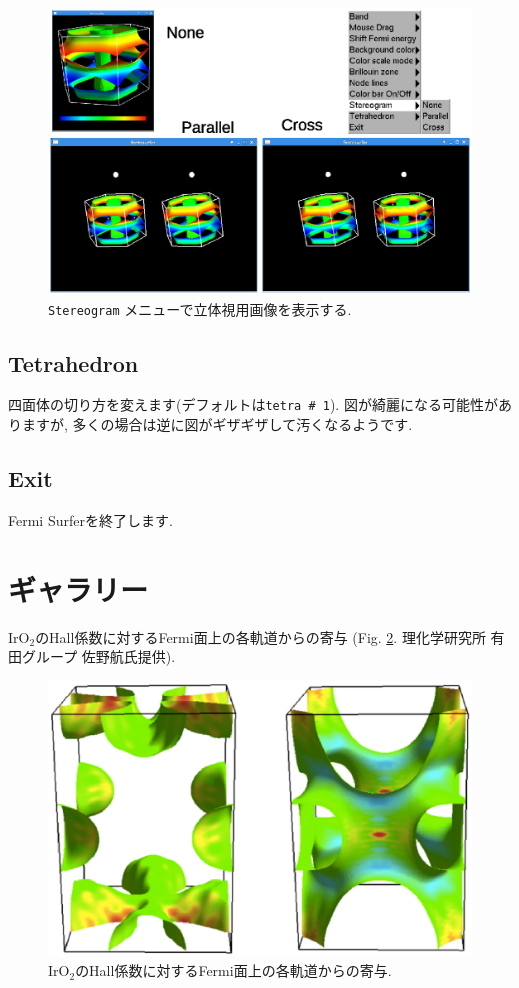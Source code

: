 \documentclass[12pt]{jarticle}
\begin{document}
\begin{figure}[!ht]
  \includegraphics[width=17cm]{figs/stereogram.eps}
  \caption{\texttt{Stereogram} メニューで立体視用画像を表示する.}
  \label{fig_stereogram}
\end{figure}

\subsection{Tetrahedron}

四面体の切り方を変えます(デフォルトは\texttt{tetra \# 1}).
図が綺麗になる可能性がありますが, 
多くの場合は逆に図がギザギザして汚くなるようです. 

\subsection{Exit}

Fermi Surferを終了します. 

\section{ギャラリー}

IrO$_2$のHall係数に対するFermi面上の各軌道からの寄与
(Fig. \ref{fig_iro2}. 理化学研究所 有田グループ 佐野航氏提供). 

\begin{figure}[!ht]
  \includegraphics[width=17cm]{figs/iro2.eps}
  \caption{IrO$_2$のHall係数に対するFermi面上の各軌道からの寄与.}
  \label{fig_iro2}
\end{figure}
\end{document}
